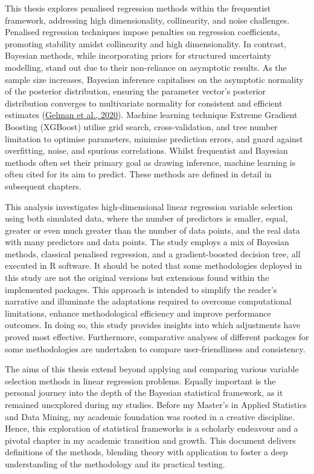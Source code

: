 \documentclass[
  11pt,
]{article}
\begin{document}
This thesis explores penalised regression methods within the frequentist
framework, addressing high dimensionality, collinearity, and noise
challenges. Penalised regression techniques impose penalties on
regression coefficients, promoting stability amidst collinearity and
high dimensionality. In contrast, Bayesian methods, while incorporating
priors for structured uncertainty modelling, stand out due to their
non-reliance on asymptotic results. As the sample size increases,
Bayesian inference capitalises on the asymptotic normality of the
posterior distribution, ensuring the parameter vector's posterior
distribution converges to multivariate normality for consistent and
efficient estimates (\protect\hyperlink{ref-Gelman2020}{Gelman et al.,
2020}). Machine learning technique Extreme Gradient Boosting (XGBoost)
utilise grid search, cross-validation, and tree number limitation to
optimise parameters, minimise prediction errors, and guard against
overfitting, noise, and spurious correlations. Whilst frequentist and
Bayesian methods often set their primary goal as drawing inference,
machine learning is often cited for its aim to predict. These methods
are defined in detail in subsequent chapters.

This analysis investigates high-dimensional linear regression variable
selection using both simulated data, where the number of predictors is
smaller, equal, greater or even much greater than the number of data
points, and the real data with many predictors and data points. The
study employs a mix of Bayesian methods, classical penalised regression,
and a gradient-boosted decision tree, all executed in R software. It
should be noted that some methodologies deployed in this study are not
the original versions but extensions found within the implemented
packages. This approach is intended to simplify the reader's narrative
and illuminate the adaptations required to overcome computational
limitations, enhance methodological efficiency and improve performance
outcomes. In doing so, this study provides insights into which
adjustments have proved most effective. Furthermore, comparative
analyses of different packages for some methodologies are undertaken to
compare user-friendliness and consistency.

The aims of this thesis extend beyond applying and comparing various
variable selection methods in linear regression problems. Equally
important is the personal journey into the depth of the Bayesian
statistical framework, as it remained unexplored during my studies.
Before my Master's in Applied Statistics and Data Mining, my academic
foundation was rooted in a creative discipline. Hence, this exploration
of statistical frameworks is a scholarly endeavour and a pivotal chapter
in my academic transition and growth. This document delivers definitions
of the methods, blending theory with application to foster a deep
understanding of the methodology and its practical testing.
\end{document}
